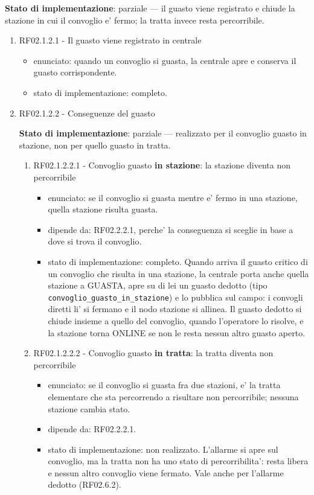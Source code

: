 \documentclass[11pt]{article}
\begin{document}
\textbf{Stato di implementazione}: parziale — il guasto viene registrato e chiude la stazione in cui il
convoglio e' fermo; la tratta invece resta percorribile.
\begin{enumerate}
\item RF02.1.2.1 - Il guasto viene registrato in centrale
\label{sec:org340ac5a}
\begin{itemize}
\item enunciato: quando un convoglio si guasta, la centrale apre e conserva il guasto corrispondente.
\item stato di implementazione: completo.
\end{itemize}
\item RF02.1.2.2 - Conseguenze del guasto
\label{sec:org19b3655}

\textbf{Stato di implementazione}: parziale — realizzato per il convoglio guasto in stazione, non per
quello guasto in tratta.
\begin{enumerate}
\item RF02.1.2.2.1 - Convoglio guasto \textbf{in stazione}: la stazione diventa non percorribile
\label{sec:org0073dbe}
\begin{itemize}
\item enunciato: se il convoglio si guasta mentre e' fermo in una stazione, quella stazione risulta
guasta.
\item dipende da: RF02.2.2.1, perche' la conseguenza si sceglie in base a dove si trova il convoglio.
\item stato di implementazione: completo. Quando arriva il guasto critico di un convoglio che risulta
in una stazione, la centrale porta anche quella stazione a GUASTA, apre su di lei un guasto dedotto
(tipo \texttt{convoglio\_guasto\_in\_stazione}) e lo pubblica sul campo: i convogli diretti li' si fermano e
il nodo stazione si allinea. Il guasto dedotto si chiude insieme a quello del convoglio, quando
l'operatore lo risolve, e la stazione torna ONLINE se non le resta nessun altro guasto aperto.
\end{itemize}
\item RF02.1.2.2.2 - Convoglio guasto \textbf{in tratta}: la tratta diventa non percorribile
\label{sec:org541179b}
\begin{itemize}
\item enunciato: se il convoglio si guasta fra due stazioni, e' la tratta elementare che sta percorrendo
a risultare non percorribile; nessuna stazione cambia stato.
\item dipende da: RF02.2.2.1.
\item stato di implementazione: non realizzato. L'allarme si apre sul convoglio, ma la tratta non ha uno
stato di percorribilita': resta libera e nessun altro convoglio viene fermato. Vale anche per
l'allarme dedotto (RF02.6.2).
\end{itemize}
\end{enumerate}
\end{enumerate}
\end{document}

